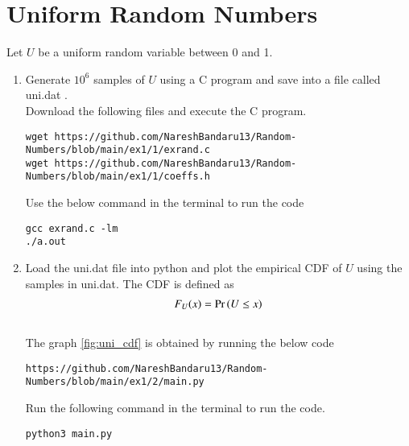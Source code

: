 \documentclass[journal,12pt,twocolumn]{IEEEtran}
\renewcommand\thesection{\arabic{section}}
\begin{document}
\section{Uniform Random Numbers}
Let $U$ be a uniform random variable between 0 and 1.
\begin{enumerate}[label=\thesection.\arabic*
,ref=\thesection.\theenumi]
\item Generate $10^6$ samples of $U$ using a C program and save into a file called uni.dat .
\\
\solution Download the following files and execute the  C program.
\begin{lstlisting}
wget https://github.com/NareshBandaru13/Random-Numbers/blob/main/ex1/1/exrand.c
wget https://github.com/NareshBandaru13/Random-Numbers/blob/main/ex1/1/coeffs.h
\end{lstlisting}
Use the below command in the terminal to run the code
\begin{lstlisting}
gcc exrand.c -lm
./a.out
\end{lstlisting}

%
\item
Load the uni.dat file into python and plot the empirical CDF of $U$ using the samples in uni.dat. The CDF is defined as
\begin{align}
F_{U}(x) = \Pr\left(U \le x\right)
\end{align}
\\
\solution 
The graph \ref{fig:uni_cdf} is obtained by running the below code
\begin{lstlisting}
https://github.com/NareshBandaru13/Random-Numbers/blob/main/ex1/2/main.py
\end{lstlisting}
Run the following command in the terminal to run the code.\\
\begin{lstlisting}
python3 main.py
\end{lstlisting}


\end{enumerate}
\end{document}
